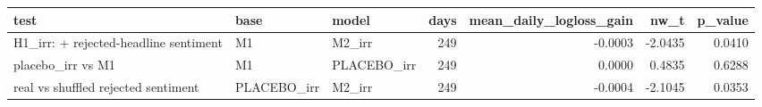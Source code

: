 \begin{tabular}{lllrrrr}
\toprule
test & base & model & days & mean\_daily\_logloss\_gain & nw\_t & p\_value \\
\midrule
H1\_irr: + rejected-headline sentiment & M1 & M2\_irr & 249 & -0.0003 & -2.0435 & 0.0410 \\
placebo\_irr vs M1 & M1 & PLACEBO\_irr & 249 & 0.0000 & 0.4835 & 0.6288 \\
real vs shuffled rejected sentiment & PLACEBO\_irr & M2\_irr & 249 & -0.0004 & -2.1045 & 0.0353 \\
\bottomrule
\end{tabular}

